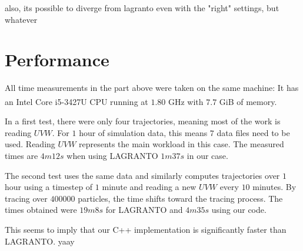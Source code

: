 also, its possible to diverge from lagranto even with the "right" settings, but whatever


\section{Performance}
All time measurements in the part above were taken on the same machine: It has an Intel\textsuperscript{\textregistered} Core\textsuperscript{\texttrademark} i5-3427U CPU running at $1.80$ GHz with $7.7$ GiB of memory.

In a first test, there were only four trajectories, meaning most of the work is reading $UVW$. For $1$ hour of simulation data, this means $7$ data files need to be used. Reading $UVW$ represents the main workload in this case. The measured times are $4m 12s$ when using LAGRANTO $1m 37s$ in our case.

The second test uses the same data and similarly computes trajectories over $1$ hour using a timestep of $1$ minute and reading a new $UVW$ every $10$ minutes. By tracing over $400000$ particles, the time shifts toward the tracing process. The times obtained were $19m 8s$ for LAGRANTO and $4m 35s$ using our code.

This seems to imply that our C++ implementation is significantly faster than LAGRANTO. yaay %

